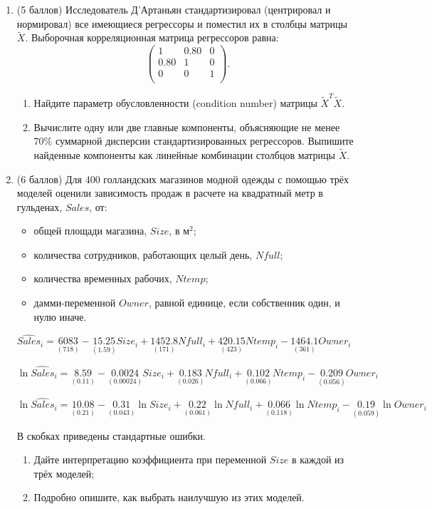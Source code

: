 \documentclass[12pt]{article}
\theoremstyle{definition}
\begin{document}
\begin{enumerate}
\item
(5 баллов)
Исследователь Д'Артаньян стандартизировал (центрировал и нормировал) все имеющиеся регрессоры и поместил их в столбцы матрицы $\tilde X$. Выборочная корреляционная матрица регрессоров равна:
\[
\begin{pmatrix}
1 & 0.80 & 0  \\
0.80 & 1 & 0  \\
0 & 0 & 1 \\
\end{pmatrix}.
\]
\begin{enumerate}
    \item Найдите параметр обусловленности (condition number) матрицы  $\tilde X^T \tilde X$.
    \item Вычислите одну или две главные компоненты, объясняющие не менее 70\% суммарной дисперсии стандартизированных регрессоров. Выпишите найденные компоненты как линейные комбинации столбцов матрицы $\tilde X$.
\end{enumerate}
\newpage

\item
(6 баллов)
Для 400 голландских магазинов модной одежды с помощью трёх моделей оценили зависимость продаж в расчете на квадратный метр в гульденах, $Sales$, от:
\begin{itemize}
\item общей площади магазина, $Size$, в м$^2$;
\item количества сотрудников, работающих целый день, $Nfull$;
\item количества временных рабочих, $Ntemp$;
\item дамми-переменной $Owner$, равной единице, если собственник один, и нулю иначе.
\end{itemize}

$\widehat{Sales}_i = \underset{(718)}{6083} - \underset{(1.59)}{15.25}Size_i + \underset{(171)}{1452.8} Nfull_i + \underset{(423)}{420.15} Ntemp_i - \underset{(361)}{1464.1} Owner_i$

$\ln \widehat{Sales}_i = \underset{(0.11)}{8.59} - \underset{(0.00024)}{0.0024}Size_i + \underset{(0.026)}{0.183} Nfull_i + \underset{(0.066)}{0.102} Ntemp_i - \underset{(0.056)}{0.209} Owner_i$

$\ln \widehat{Sales}_i = \underset{(0.21)}{10.08} - \underset{(0.043)}{0.31}\ln Size_i + \underset{(0.061)}{0.22} \ln Nfull_i + \underset{(0.118)}{0.066} \ln Ntemp_i - \underset{(0.059)}{0.19} \ln Owner_i$

В скобках приведены стандартные ошибки.

\begin{enumerate}
    \item Дайте интерпретацию коэффициента при переменной $Size$ в каждой из трёх моделей;
    \item Подробно опишите, как выбрать наилучшую из этих моделей.
\end{enumerate}

\end{enumerate}
\end{document}
